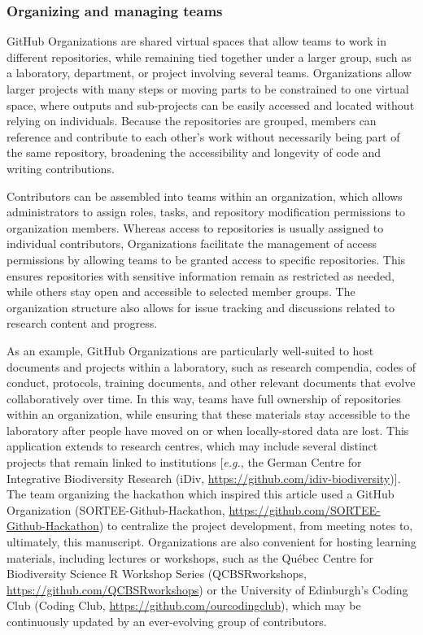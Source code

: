 \hypertarget{organizations}{%
\subsubsection{Organizing and managing teams}\label{organizations}}

GitHub Organizations are shared virtual spaces that allow teams to work in different repositories, while remaining tied together under a larger group, such as a laboratory, department, or project involving several teams.
Organizations allow larger projects with many steps or moving parts to be constrained to one virtual space, where outputs and sub-projects can be easily accessed and located without relying on individuals.
Because the repositories are grouped, members can reference and contribute to each other's work without necessarily being part of the same repository, broadening the accessibility and longevity of code and writing contributions.

Contributors can be assembled into teams within an organization, which allows administrators to assign roles, tasks, and repository modification permissions to organization members.
Whereas access to repositories is usually assigned to individual contributors, Organizations facilitate the management of access permissions by allowing teams to be granted access to specific repositories.
This ensures repositories with sensitive information remain as restricted as needed, while others stay open and accessible to selected member groups.
The organization structure also allows for issue tracking and discussions related to research content and progress.

As an example, GitHub Organizations are particularly well-suited to host documents and projects within a laboratory, such as research compendia, codes of conduct, protocols, training documents, and other relevant documents that evolve collaboratively over time.
In this way, teams have full ownership of repositories within an organization, while ensuring that these materials stay accessible to the laboratory after people have moved on or when locally-stored data are lost.
This application extends to research centres, which may include several distinct projects that remain linked to institutions {[}\emph{e.g.}, the German Centre for Integrative Biodiversity Research (iDiv, \url{https://github.com/idiv-biodiversity}){]}.
The team organizing the hackathon which inspired this article used a GitHub Organization (SORTEE-Github-Hackathon, \url{https://github.com/SORTEE-Github-Hackathon}) to centralize the project development, from meeting notes to, ultimately, this manuscript.
Organizations are also convenient for hosting learning materials, including lectures or workshops, such as the Québec Centre for Biodiversity Science R Workshop Series (QCBSRworkshops, \url{https://github.com/QCBSRworkshops}) or the University of Edinburgh's Coding Club (Coding Club, \url{https://github.com/ourcodingclub}), which may be continuously updated by an ever-evolving group of contributors.

